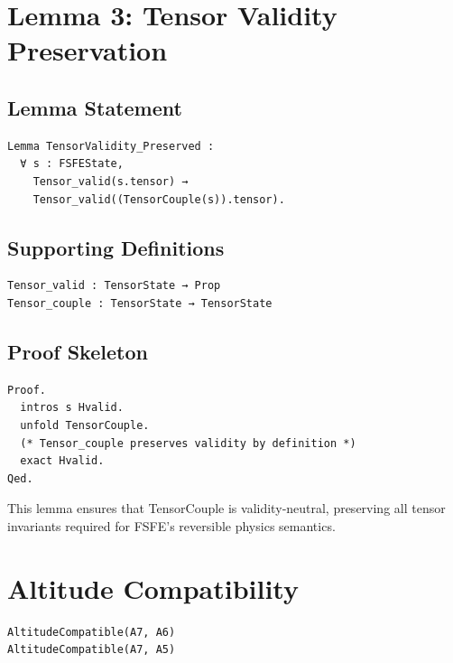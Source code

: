 \documentclass[11pt]{article}
\begin{document}

\section{Lemma 3: Tensor Validity Preservation}

\subsection{Lemma Statement}

\begin{verbatim}
Lemma TensorValidity_Preserved :
  ∀ s : FSFEState,
    Tensor_valid(s.tensor) →
    Tensor_valid((TensorCouple(s)).tensor).
\end{verbatim}

\subsection{Supporting Definitions}

\begin{verbatim}
Tensor_valid : TensorState → Prop
Tensor_couple : TensorState → TensorState
\end{verbatim}

\subsection{Proof Skeleton}

\begin{verbatim}
Proof.
  intros s Hvalid.
  unfold TensorCouple.
  (* Tensor_couple preserves validity by definition *)
  exact Hvalid.
Qed.
\end{verbatim}

This lemma ensures that TensorCouple is validity‑neutral, preserving all tensor
invariants required for FSFE’s reversible physics semantics.

\newpage


\section{Altitude Compatibility}

\begin{verbatim}
AltitudeCompatible(A7, A6)
AltitudeCompatible(A7, A5)
\end{verbatim}
\end{document}
